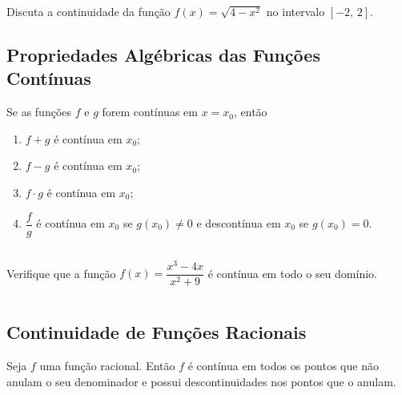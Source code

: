 \begin{frame}
  \begin{example}
    Discuta a continuidade da função $f(x) = \sqrt{4-x^{2}}$ no intervalo $[-2,\,2]$.
  \end{example}
  \begin{figure}
  \end{figure}
\end{frame}

\subsection{Propriedades Algébricas das Funções Contínuas}
\begin{frame}
  \begin{theorem}
    Se as funções $f$ e $g$ forem contínuas em $x=x_{0}$, então
    \begin{enumerate}
      \item $f+g$ é contínua em $x_{0}$;
      \item $f-g$ é contínua em $x_{0}$;
      \item $f\cdot g$ é contínua em $x_{0}$;
      \item $\dfrac{f}{g}$ é contínua em $x_{0}$ se $g(x_{0})\not=0$ e descontínua em $x_{0}$ se $g(x_{0}) = 0$.
    \end{enumerate}
  \end{theorem}
\end{frame}

\begin{frame}
  \begin{columns}[onlytextwidth]
    \begin{column}{0.7\textwidth}\vspace{-0.5cm}
      \begin{example}
        Verifique que a função $f(x) = \dfrac{x^{3}-4x}{x^{2}+9}$ é contínua em todo o seu domínio.
      \end{example}
    \end{column}
    \begin{column}{0.3\textwidth}\vspace{-0.5cm}
    \end{column}
  \end{columns}
\end{frame}

\subsection{Continuidade de Funções Racionais}
\begin{frame}
  \begin{theorem}
    Seja $f$ uma função racional. Então $f$ é contínua em todos os pontos que não anulam o seu denominador e possui descontinuidades nos pontos que o anulam.
  \end{theorem}
\end{frame}

